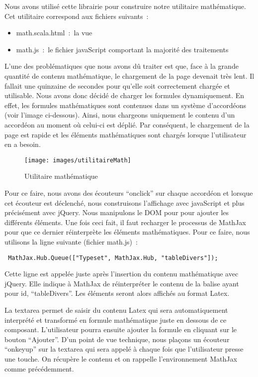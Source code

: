 Nous avons utilisé cette librairie pour construire notre utilitaire mathématique. Cet utilitaire correspond aux fichiers suivants~:
\smallskip
\begin{itemize}
\item math.scala.html~:~la vue
\item math.js~:~le fichier javaScript comportant la majorité des traitements
\end{itemize}
\medskip

L'une des problématiques que nous avons dû traiter est que, face à la grande quantité de contenu mathématique, le chargement de la page devenait très lent. Il fallait une quinzaine de secondes pour qu'elle soit correctement chargée et utilisable. Nous avons donc décidé de charger les formules dynamiquement. En effet, les formules mathématiques sont contenues dans un système d'accordéons (voir l'image ci-dessous). Ainsi, nous chargeons uniquement le contenu d'un accordéon au moment où celui-ci est déplié. Par conséquent, le chargement de la page est rapide et les éléments mathématiques sont chargés lorsque l'utilisateur en a besoin. 

\begin{figure}
\begin{center}
\texttt{[image: images/utilitaireMath]}
\caption{Utilitaire mathématique}
\end{center}
\end{figure}

Pour ce faire, nous avons des écouteurs \enquote{onclick} sur chaque accordéon et lorsque cet écouteur est déclenché, nous construisons l'affichage avec javaScript et plus précisément avec jQuery. Nous manipulons le DOM pour pour ajouter les différents éléments. Une fois ceci fait, il faut recharger le processus de MathJax pour que ce dernier réinterprète les éléments mathématiques. Pour ce faire, nous utilisons la ligne suivante (fichier math.js)~:
\begin{lstlisting}
 MathJax.Hub.Queue(["Typeset", MathJax.Hub, "tableDivers"]);
\end{lstlisting}  

Cette ligne est appelée juste après l'insertion du contenu mathématique avec jQuery. Elle indique à MathJax de réinterpréter le contenu de la balise ayant pour id, \enquote{tableDivers}. Les éléments seront alors affichés au format Latex. 

La textarea permet de saisir du contenu Latex qui sera automatiquement interprété et transformé en formule mathématique juste en dessous de ce composant. L'utilisateur pourra ensuite ajouter la formule en cliquant sur le bouton \enquote{Ajouter}. D'un point de vue technique, nous plaçons un écouteur \enquote{onkeyup} sur la textarea qui sera appelé à chaque fois que l'utilisateur presse une touche. On récupère le contenu et on rappelle l'environnement MathJax comme précédemment.   

